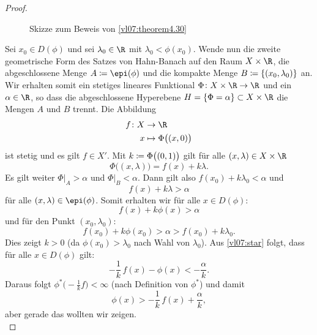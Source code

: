 \begin{proof}
\begin{figure}
    \caption{Skizze zum Beweis von \cref{vl07:theorem4.30}}
    \label{vl07:fig:theorem4.30}
\end{figure}
%
    Sei $x_0\in D(\phi)$ und sei $\lambda_0\in\R$ mit $\lambda_0 < \phi(x_0)$.
    Wende nun die zweite geometrische Form des Satzes von Hahn-Banach
     auf den Raum $X\times\R$, die abgeschlossene
    Menge $A\defeq \epi(\phi)$ und die kompakte Menge $B\coloneqq
    \{(x_0,\lambda_0)\}$ an. 
    Wir erhalten somit ein stetiges lineares Funktional $\Phi\colon
    X\times\R\to\R$ und ein $\alpha\in\R$, so dass die abgeschlossene Hyperebene
    $H=\{ \Phi = \alpha \} \subset X\times\R$ die Mengen $A$ und $B$ trennt.  Die
    Abbildung
    \begin{align*}
        f\colon X &\to \R   \\
        x &\mapsto \Phi\bigl( (x,0) \bigr)
    \end{align*}
    ist stetig und es gilt $f\in X'$. Mit $k \coloneqq \Phi\bigl( (0,1) \bigr)$
    gilt für alle $(x,\lambda)\in X\times\R$
    \[ \Phi\bigl( (x,\lambda) \bigr) = f(x) + k\lambda  . \]
    Es gilt weiter $\Phi\vert_A > \alpha$ und $\Phi\vert_B < \alpha$. Dann gilt 
    also $f(x_0) + k\lambda_0 < \alpha$ und
    \[ f(x) + k\lambda > \alpha   \]
    für alle $(x,\lambda)\in\epi(\phi)$.
    Somit erhalten wir für alle $x\in D(\phi)$:
    \[ \tag{$\star$} \label{vl07:star}
        f(x) + k\phi(x) > \alpha
    \]
    und für den Punkt $(x_0,\lambda_0)$:
    \[ f(x_0)+k\phi(x_0) > \alpha > f(x_0) + k\lambda_0  . \]
    Dies zeigt $k>0$ (da $\phi(x_0) > \lambda_0$ nach Wahl von $\lambda_0$). Aus \eqref{vl07:star}
    folgt, dass für alle $x\in D(\phi)$ gilt:
    \[ -\frac{1}{k}\,f(x) - \phi(x) < - \frac{\alpha}{k}  . \]
    Daraus folgt $\phi^\ast\bigl( -\frac{1}{k} f \bigr) < \infty$ (nach Definition
    von $\phi^\ast$) und damit
    \[ \phi(x) > -\frac{1}{k}\,f(x) + \frac{\alpha}{k}  , \]
    aber gerade das wollten wir zeigen.
    \\
\end{proof}

